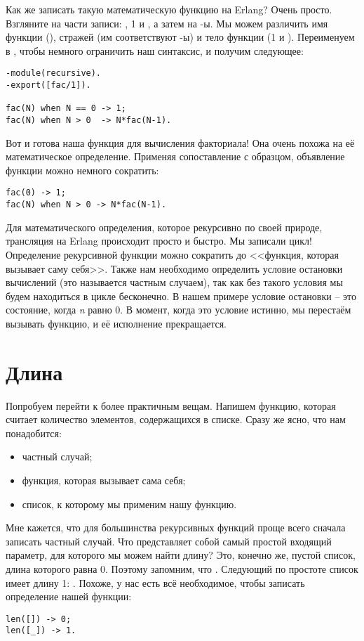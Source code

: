 Как же записать такую математическую функцию на Erlang? Очень просто.
Взгляните на части записи: , 1 и , а затем на \--ы.
Мы можем различить имя функции (), стражей (им соответствуют \--ы) и тело функции (1 и ).
Переименуем  в , чтобы немного ограничить наш синтаксис, и получим следующее:
\begin{lstlisting}[style=erlang]
-module(recursive).
-export([fac/1]).
 
fac(N) when N == 0 -> 1;
fac(N) when N > 0  -> N*fac(N-1).
\end{lstlisting}

Вот и готова наша функция для вычисления факториала!
Она очень похожа на её математическое определение.
Применяя сопоставление с образцом, объявление функции можно немного сократить:
\begin{lstlisting}[style=erlang]
fac(0) -> 1;
fac(N) when N > 0 -> N*fac(N-1).
\end{lstlisting}

Для математического определения, которое рекурсивно по своей природе, трансляция на Erlang происходит просто и быстро.
Мы записали цикл!
Определение рекурсивной функции можно сократить до <<функция, которая вызывает саму себя>>.
Также нам необходимо определить условие остановки вычислений (это называется частным случаем), так как без такого условия мы будем находиться в цикле бесконечно.
В нашем примере условие остановки \--- это состояние, когда \emph{n} равно 0.
В момент, когда это условие истинно, мы перестаём вызывать функцию, и её исполнение прекращается. 
\section{Длина}
\label{length}
Попробуем перейти к более практичным вещам.
Напишем функцию, которая считает количество элементов, содержащихся в списке.
Сразу же ясно, что нам понадобится:\\
\begin{itemize}
\item частный случай;
\item функция, которая вызывает сама себя;
\item список, к которому мы применим нашу функцию.
\end{itemize}

Мне кажется, что для большинства рекурсивных функций проще всего сначала записать частный случай.
Что представляет собой самый простой входящий параметр, для которого мы можем найти длину?
Это, конечно же, пустой список, длина которого равна 0.
Поэтому запомним, что .
Следующий по простоте список имеет длину 1: .
Похоже, у нас есть всё необходимое, чтобы записать определение нашей функции:
\begin{lstlisting}[style=erlang]
len([]) -> 0;
len([_]) -> 1.
\end{lstlisting}

